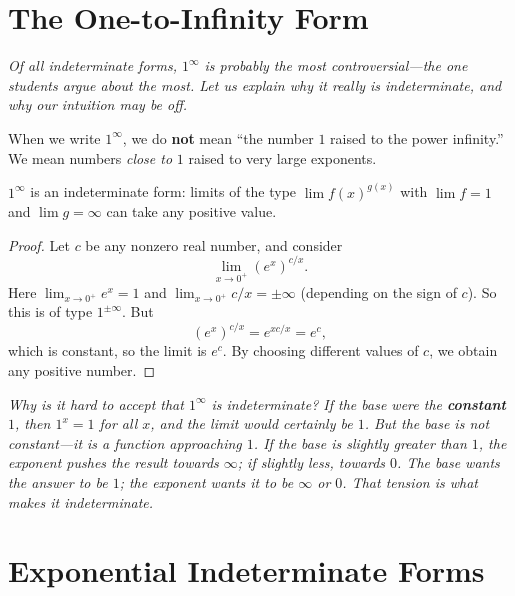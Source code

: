\section{The One-to-Infinity Form}
\label{sec:6.11}

\textit{Of all indeterminate forms, $1^{\infty}$ is probably the most controversial---the one students argue about the most.  Let us explain why it really is indeterminate, and why our intuition may be off.}

When we write $1^{\infty}$, we do \textbf{not} mean ``the number $1$ raised to the power infinity.''  We mean numbers \emph{close to} $1$ raised to very large exponents.

\begin{proposition}
\label{thm:6-2}
$1^{\infty}$ is an indeterminate form: limits of the type $\lim f(x)^{g(x)}$ with $\lim f = 1$ and $\lim g = \infty$ can take any positive value.
\end{proposition}

\begin{proof}
Let $c$ be any nonzero real number, and consider
\[
  \lim_{x \to 0^{+}} (e^{x})^{c/x}.
\]
Here $\lim_{x \to 0^{+}} e^{x} = 1$ and $\lim_{x \to 0^{+}} c/x = \pm\infty$ (depending on the sign of $c$).  So this is of type $1^{\pm\infty}$.  But
\[
  (e^{x})^{c/x} = e^{xc/x} = e^{c},
\]
which is constant, so the limit is $e^{c}$.  By choosing different values of $c$, we obtain any positive number.
\end{proof}

\textit{Why is it hard to accept that $1^{\infty}$ is indeterminate?  If the base were the \textbf{constant} $1$, then $1^{x} = 1$ for all $x$, and the limit would certainly be $1$.  But the base is not constant---it is a function approaching $1$.  If the base is slightly greater than $1$, the exponent pushes the result towards $\infty$; if slightly less, towards $0$.  The base wants the answer to be $1$; the exponent wants it to be $\infty$ or $0$.  That tension is what makes it indeterminate.}

\section{Exponential Indeterminate Forms}
\label{sec:6.12}


